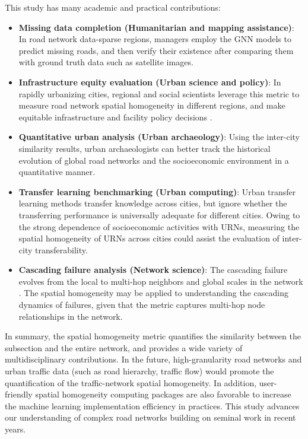 \documentclass[10pt]{wlscirep}
\begin{document}
This study has many academic and practical contributions:
\begin{itemize} %
\item \textbf{Missing data completion (Humanitarian and mapping assistance)}: In road network data-sparse regions, managers employ the GNN models to predict missing roads, and then verify their existence after comparing them with ground truth data such as satellite images.

\item \textbf{Infrastructure equity evaluation (Urban science and policy)}: In rapidly urbanizing cities, regional and social scientists leverage this metric to measure road network spatial homogeneity in different regions, and make equitable infrastructure and facility policy decisions \cite{hanson2004geography}.

\item \textbf{Quantitative urban analysis (Urban archaeology)}: Using the inter-city similarity results, urban archaeologists can better track the historical evolution of global road networks \cite{zischg2019century} and the socioeconomic environment in a quantitative manner.

\item \textbf{Transfer learning benchmarking (Urban computing)}: Urban transfer learning methods \cite{dai2009eigentransfer,dong2019predicting,yabe2020unsupervised} transfer knowledge across cities, but ignore whether the transferring performance is universally adequate for different cities. Owing to the strong dependence of socioeconomic activities with URNs, measuring the spatial homogeneity of URNs across cities could assist the evaluation of inter-city transferability. 

\item \textbf{Cascading failure analysis (Network science)}: The cascading failure evolves from the local to multi-hop neighbors and global scales in the network \cite{zhao2016spatio}. The spatial homogeneity may be applied to understanding the cascading dynamics of failures, given that the metric captures multi-hop node relationships in the network.
\end{itemize}

In summary, the spatial homogeneity metric quantifies the similarity between the subsection and the entire network, and provides a wide variety of multidisciplinary contributions. In the future, high-granularity road networks and urban traffic data (such as road hierarchy, traffic flow) would promote the quantification of the traffic-network spatial homogeneity. In addition, user-friendly spatial homogeneity computing packages are also favorable to increase the machine learning implementation efficiency in practices. This study advances our understanding of complex road networks building on seminal work \cite{li2015percolation,saberi2020simple,ccolak2016understanding,loder2019understanding,zeng2020multiple} in recent years. 
\end{document}
